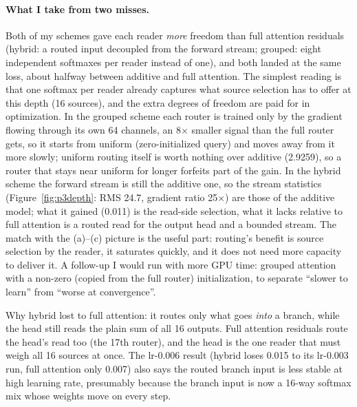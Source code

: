\paragraph{What I take from two misses.} Both of my schemes gave each reader \emph{more} freedom than full attention residuals (hybrid: a routed input decoupled from the forward stream; grouped: eight independent softmaxes per reader instead of one), and both landed at the same loss, about halfway between additive and full attention. The simplest reading is that one softmax per reader already captures what source selection has to offer at this depth (16 sources), and the extra degrees of freedom are paid for in optimization. In the grouped scheme each router is trained only by the gradient flowing through its own 64 channels, an 8$\times$ smaller signal than the full router gets, so it starts from uniform (zero-initialized query) and moves away from it more slowly; uniform routing itself is worth nothing over additive (2.9259), so a router that stays near uniform for longer forfeits part of the gain. In the hybrid scheme the forward stream is still the additive one, so the stream statistics (Figure~\ref{fig:p3depth}: RMS 24.7, gradient ratio 25$\times$) are those of the additive model; what it gained (0.011) is the read-side selection, what it lacks relative to full attention is a routed read for the output head and a bounded stream. The match with the (a)--(c) picture is the useful part: routing's benefit is source selection by the reader, it saturates quickly, and it does not need more capacity to deliver it. A follow-up I would run with more GPU time: grouped attention with a non-zero (copied from the full router) initialization, to separate ``slower to learn'' from ``worse at convergence''.

Why hybrid lost to full attention: it routes only what goes \emph{into} a branch, while the head still reads the plain sum of all 16 outputs. Full attention residuals route the head's read too (the 17th router), and the head is the one reader that must weigh all 16 sources at once. The lr-0.006 result (hybrid loses 0.015 to its lr-0.003 run, full attention only 0.007) also says the routed branch input is less stable at high learning rate, presumably because the branch input is now a 16-way softmax mix whose weights move on every step.

